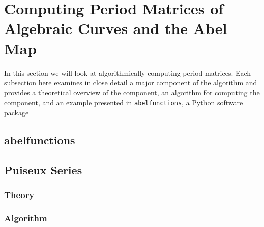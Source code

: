 \section{Computing Period Matrices of Algebraic Curves and the Abel Map}

In this section we will look at algorithmically computing period
matrices. Each subsection here examines in close detail a major
component of the algorithm and provides a theoretical overview of the
component, an algorithm for computing the component, and an example
presented in {\tt abelfunctions}, a Python software package

\subsection{abelfunctions}

\subsection{Puiseux Series}

\subsubsection*{Theory}

\subsubsection*{Algorithm}

